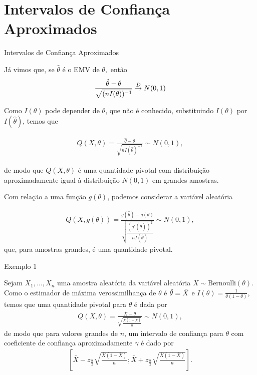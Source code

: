 \documentclass[12pt]{beamer}
\begin{document}
\section{Intervalos de Confiança Aproximados}
\begin{frame}{Intervalos de Confiança Aproximados}
\begin{block}{}
\justifying
Já vimos que, se $\hat{\theta}$ é o EMV de $\theta,$ então 
\begin{align*}
    \dfrac{\hat{\theta}-\theta}{\sqrt{(nI(\theta))^{-1}}}\overset{D}{\rightarrow} N(0,1)
\end{align*}
\end{block}
\pause
\begin{block}{}
\justifying
Como $I(\theta)$ pode depender de $\theta$, que não é conhecido, substituindo $I(\theta)$ por $I(\hat{\theta})$, temos que

\begin{align*}
Q(X, \theta) = \frac{\hat{\theta} - \theta}{\sqrt{nI(\hat{\theta})^{-1}}} \sim N(0, 1),
\end{align*}

de modo que $Q(X, \theta)$ é uma quantidade pivotal com distribuição aproximadamente igual à distribuição $N(0, 1)$ em grandes amostras.
\end{block}
\end{frame}

\begin{frame}{}
\begin{block}{}
\justifying
Com relação a uma função $g(\theta)$, podemos considerar a variável aleatória

\begin{align*}
Q(X, g(\theta)) = \frac{g(\hat{\theta}) - g(\theta)}{\sqrt{\dfrac{(g'(\hat{\theta}))^2}{nI(\hat{\theta})}}} \sim N(0, 1),
\end{align*}
que, para amostras grandes, é uma quantidade pivotal.
\end{block}
\end{frame}

\begin{frame}{Exemplo 1}
\begin{block}{}
\justifying
Sejam $X_1, \ldots, X_n$ uma amostra aleatória da variável aleatória $X \sim \text{Bernoulli}(\theta)$. Como o estimador de máxima verossimilhança de $\theta$ é $\hat{\theta} = \Bar{X}$ e $I(\theta) = \frac{1}{\theta(1 - \theta)}$, temos que uma quantidade pivotal para $\theta$ é dada por
\begin{align*}
Q(X, \theta) = \frac{\bar{X} - \theta}{\sqrt{\frac{\bar{X}(1-\bar{X})}{n}}} \sim N(0, 1),
\end{align*}
de modo que para valores grandes de $n$, um intervalo de confiança para $\theta$ com coeficiente de confiança aproximadamente $\gamma$ é dado por
\begin{align*}
\left[ \bar{X} - z_{\frac{\alpha}{2}} \sqrt{\frac{\bar{X}(1 - \bar{X})}{n}} ; \bar{X} + z_{\frac{\alpha}{2}} \sqrt{\frac{\bar{X}(1 - \bar{X})}{n}} \right].
\end{align*}
\end{block}
\end{frame}
\end{document}
